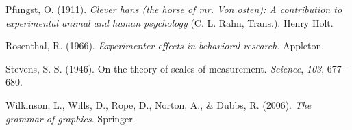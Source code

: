 \documentclass[
  letterpaper,
]{book}
\newlength{\cslhangindent}
\newlength{\cslentryspacingunit} %
\newenvironment{CSLReferences}[2] %
 {%
  \setlength{\parindent}{0pt}
  \ifodd #1
  \let\oldpar\par
  \def\par{\hangindent=\cslhangindent\oldpar}
  \fi
  \setlength{\parskip}{#2\cslentryspacingunit}
 }%
 {}
\begin{document}
\begin{CSLReferences}{1}{0}
\leavevmode{}%
Pfungst, O. (1911). \emph{Clever hans (the horse of mr. Von osten): A
contribution to experimental animal and human psychology} (C. L. Rahn,
Trans.). Henry Holt.

\leavevmode{}%
Rosenthal, R. (1966). \emph{Experimenter effects in behavioral
research}. Appleton.

\leavevmode{}%
Stevens, S. S. (1946). On the theory of scales of measurement.
\emph{Science}, \emph{103}, 677--680.

\leavevmode{}%
Wilkinson, L., Wills, D., Rope, D., Norton, A., \& Dubbs, R. (2006).
\emph{The grammar of graphics}. Springer.

\end{CSLReferences}


\backmatter

\printindex

\end{document}
